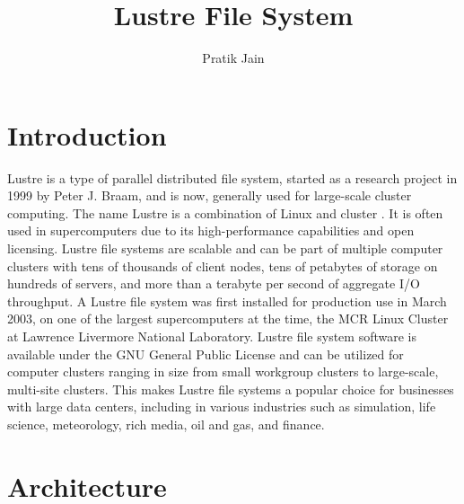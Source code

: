 \documentclass[9pt,twocolumn,twoside]{styles/osajnl}
\title{Lustre File System}
\author{Pratik Jain}
\affil{School of Informatics and Computing, Bloomington, IN 47408, U.S.A.}
\affil{Corresponding authors: jainps@iu.edu}
\begin{document}
\maketitle

\section{Introduction}

Lustre is a type of parallel distributed file system, started as a
research project in 1999 by Peter J. Braam, and is now, generally used
for large-scale cluster computing. The name Lustre is a combination of
Linux and cluster \cite{www-ungrid}. It is often used in
supercomputers due to its high-performance capabilities and open
licensing. Lustre file systems are scalable and can be part of
multiple computer clusters with tens of thousands of client nodes,
tens of petabytes of storage on hundreds of servers, and more than a
terabyte per second of aggregate I/O throughput.  A Lustre file system
was first installed for production use in March 2003, on one of the
largest supercomputers at the time, the MCR Linux Cluster at Lawrence
Livermore National Laboratory. Lustre file system software is
available under the GNU General Public License and can be utilized for
computer clusters ranging in size from small workgroup clusters to
large-scale, multi-site clusters. This makes Lustre file systems a
popular choice for businesses with large data centers, including in
various industries such as simulation, life science, meteorology, rich
media, oil and gas, and finance.

\section{Architecture}
\end{document}
